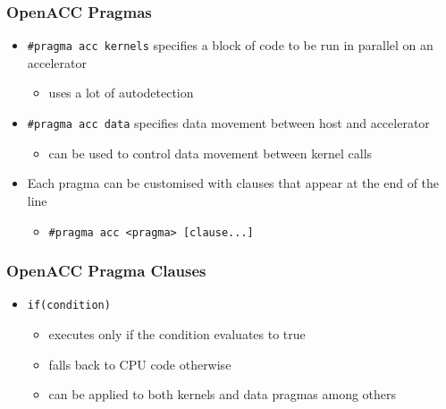 \subsubsection{OpenACC Pragmas}\label{openacc-pragmas}

\begin{itemize}
\itemsep1pt\parskip0pt
\item
  \texttt{\#pragma acc kernels} specifies a block of code to be run in
  parallel on an accelerator

  \begin{itemize}
  \itemsep1pt\parskip0pt
  \item
    uses a lot of autodetection
  \end{itemize}
\item
  \texttt{\#pragma acc data} specifies data movement between host and
  accelerator

  \begin{itemize}
  \itemsep1pt\parskip0pt
  \item
    can be used to control data movement between kernel calls
  \end{itemize}
\item
  Each pragma can be customised with clauses that appear at the end of
  the line

  \begin{itemize}
  \itemsep1pt\parskip0pt
  \item
    \texttt{\#pragma acc \textless{}pragma\textgreater{} {[}clause...{]}}
  \end{itemize}
\end{itemize}

\subsubsection{OpenACC Pragma Clauses}\label{openacc-pragma-clauses}

\begin{itemize}
\itemsep1pt\parskip0pt
\item
  \texttt{if(condition)}

  \begin{itemize}
  \itemsep1pt\parskip0pt
  \item
    executes only if the condition evaluates to true
  \item
    falls back to CPU code otherwise
  \item
    can be applied to both kernels and data pragmas among others
  \end{itemize}
\end{itemize}

